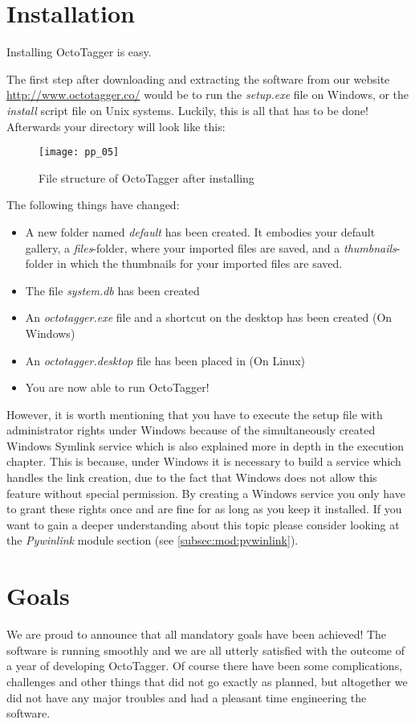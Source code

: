 \section{Installation}
Installing OctoTagger is easy.

The first step after downloading and extracting the software from our website \url{http://www.octotagger.co/} would be to run the \textit{setup.exe} file on Windows, or the \emph{install} script file on Unix systems. Luckily, this is all that has to be done! Afterwards your directory will look like this:

\begin{figure}[H]
    \centering
	\texttt{[image: pp\_05]}
	\caption{File structure of OctoTagger after installing}
\end{figure}


The following things have changed:
\begin{itemize}
	\item A new folder named \emph{default} has been created. It embodies your default gallery, a \emph{files}-folder, where your imported files are saved, and a \emph{thumbnails}-folder in which the thumbnails for your imported files are saved.
	\item The file \textit{system.db} has been created
	\item An \emph{octotagger.exe} file and a shortcut on the desktop has been created (On Windows)
	\item An \emph{octotagger.desktop} file has been placed in  (On Linux) 
	\item You are now able to run OctoTagger!
\end{itemize}

However, it is worth mentioning that you have to execute the setup file with administrator rights under Windows because of the simultaneously created Windows Symlink service which is also explained more in depth in the execution chapter. This is because, under Windows it is necessary to build a service which handles the link creation, due to the fact that Windows does not allow this feature without special permission. By creating a Windows service you only have to grant these rights once and are fine for as long as you keep it installed. If you want to gain a deeper understanding about this topic please consider looking at the \textit{Pywinlink} module section (see \cref{subsec:mod:pywinlink}).

\section{Goals}
We are proud to announce that all mandatory goals have been achieved! The software is running smoothly and we are all utterly satisfied with the outcome of a year of developing OctoTagger. Of course there have been some complications, challenges and other things that did not go exactly as planned, but altogether we did not have any major troubles and had a pleasant time engineering the software.

